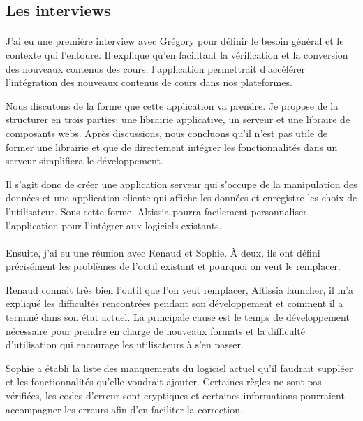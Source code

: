 \subsection{Les interviews}
\label{subsec:interviews}

\paragraph{}
J'ai eu une première interview avec Grégory pour définir le besoin général et le contexte qui l'entoure.
Il explique qu'en facilitant la vérification et la conversion des nouveaux contenus des cours, l'application permettrait d'accélérer l'intégration des nouveaux contenus de cours dans nos plateformes.

Nous discutons de la forme que cette application va prendre. 
Je propose de la structurer en trois parties: une librairie applicative, un serveur et une libraire de composants webs.
Après discussions, nous concluons qu'il n'est pas utile de former une librairie et que de directement intégrer les fonctionnalités dans un serveur simplifiera le développement.

Il s'agit donc de créer une application serveur qui s'occupe de la manipulation des données et une application cliente qui affiche les données et enregistre les choix de l'utilisateur.
Sous cette forme, Altissia pourra facilement personnaliser \fnmark l'application pour l'intégrer aux logiciels existants.

\paragraph{}
Ensuite, j'ai eu une réunion avec Renaud et Sophie.
À deux, ils ont défini précisément les problèmes de l'outil existant et pourquoi on veut le remplacer.

Renaud connait très bien l'outil que l'on veut remplacer, Altissia launcher, il m'a expliqué les difficultés rencontrées pendant son développement et comment il a terminé dans son état actuel.
La principale cause est le temps de développement nécessaire pour prendre en charge de nouveaux formats et la difficulté d'utilisation qui encourage les utilisateurs à s'en passer.

Sophie a établi la liste des manquements du logiciel actuel qu'il faudrait suppléer et les fonctionnalités qu'elle voudrait ajouter.
Certaines règles ne sont pas vérifiées, les codes d'erreur sont cryptiques et certaines informations pourraient accompagner les erreurs afin d'en faciliter la correction.

